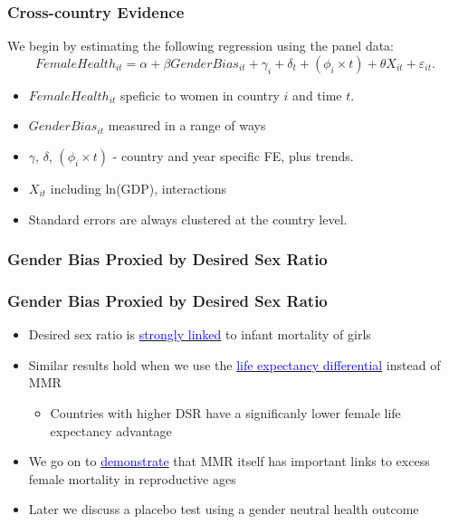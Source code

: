 \documentclass[legno]{beamer}
\begin{document}
\begin{frame}
\frametitle{Cross-country Evidence}

We begin by estimating the following regression using the panel data:
	\begin{equation}
		FemaleHealth_{it} = \alpha + \beta GenderBias_{it} + \gamma_i + \delta_t + 
               (\phi_i\times t) + \theta X_{it} + \varepsilon_{it}. \nonumber
	\end{equation}
\begin{itemize}
	\item $FemaleHealth_{it}$ speficic to women in country $i$ and time $t$.
  \item $GenderBias_{it}$ measured in a range of ways
	\item $\gamma$, $\delta$, $(\phi_i\times t)$ - country and year specific FE, plus trends.  
  \item $X_{it}$ including ln(GDP), interactions
	\item Standard errors are always clustered at the country level.
\end{itemize}
\end{frame}

\begin{frame}
\frametitle{Gender Bias Proxied by Desired Sex Ratio}

\end{frame}


\begin{frame}[label=DSR]
\frametitle{Gender Bias Proxied by Desired Sex Ratio}
\begin{itemize}
\item Desired sex ratio is \hyperlink{DSRIMR}{\textcolor{blue}{strongly linked}} to infant mortality of girls
\item Similar results hold when we use the \hyperlink{DSRLExp}{\textcolor{blue}{life expectancy differential}} instead of MMR
\begin{itemize}
\item Countries with higher DSR have a significanly lower female life expectancy advantage
\end{itemize}
\item We go on to \hyperlink{MMRmort}{\textcolor{blue}{demonstrate}} that MMR itself has important links to excess female mortality in reproductive ages
\item Later we discuss a placebo test using a gender neutral health outcome
\end{itemize}
\end{frame}
\end{document}
